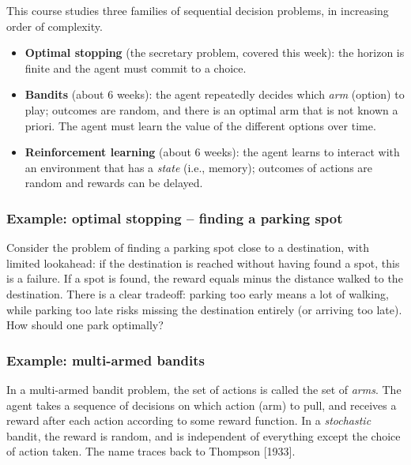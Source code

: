 This course studies three families of sequential decision problems, in increasing order of complexity.

\begin{itemize}
    \item \textbf{Optimal stopping} (the secretary problem, covered this week): the horizon is finite and the agent must commit to a choice.
    \item \textbf{Bandits} (about 6 weeks): the agent repeatedly decides which \emph{arm} (option) to play; outcomes are random, and there is an optimal arm that is not known a priori. The agent must learn the value of the different options over time.
    \item \textbf{Reinforcement learning} (about 6 weeks): the agent learns to interact with an environment that has a \emph{state} (i.e., memory); outcomes of actions are random and rewards can be delayed.
\end{itemize}

\subsubsection*{Example: optimal stopping -- finding a parking spot}

Consider the problem of finding a parking spot close to a destination, with limited lookahead: if the destination is reached without having found a spot, this is a failure. If a spot is found, the reward equals minus the distance walked to the destination. There is a clear tradeoff: parking too early means a lot of walking, while parking too late risks missing the destination entirely (or arriving too late). How should one park optimally?

\subsubsection*{Example: multi-armed bandits}

In a multi-armed bandit problem, the set of actions is called the set of \emph{arms}. The agent takes a sequence of decisions on which action (arm) to pull, and receives a reward after each action according to some reward function. In a \emph{stochastic} bandit, the reward is random, and is independent of everything except the choice of action taken. The name traces back to Thompson [1933].

